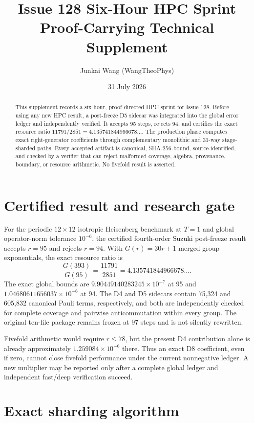 \documentclass[10pt]{article}
\title{Issue 128 Six-Hour HPC Sprint\\\large Proof-Carrying Technical Supplement}
\author{Junkai Wang (WangTheoPhys)}
\date{31 July 2026}
\begin{document}
\maketitle

\begin{abstract}
This supplement records a six-hour, proof-directed HPC sprint for Issue 128.
Before using any new HPC result, a post-freeze D5 sidecar was integrated into
the global error ledger and independently verified.  It accepts 95 steps,
rejects 94, and certifies the exact resource ratio
$11791/2851=4.135741844966678\ldots$.  The production phase computes exact
right-generator coefficients through complementary monolithic and 31-way
stage-sharded paths.  Every accepted artifact is canonical, SHA-256-bound,
source-identified, and checked by a verifier that can reject malformed
coverage, algebra, provenance, boundary, or resource arithmetic.  No
fivefold result is asserted.
\end{abstract}

\section{Certified result and research gate}

For the periodic $12\times12$ isotropic Heisenberg benchmark at $T=1$ and
global operator-norm tolerance $10^{-6}$, the certified fourth-order Suzuki
post-freeze result accepts $r=95$ and rejects $r=94$.  With
$G(r)=30r+1$ merged group exponentials, the exact resource ratio is
\[
  \frac{G(393)}{G(95)}=\frac{11791}{2851}
  =4.135741844966678\ldots .
\]
The exact global bounds are $9.90449140283245\times10^{-7}$ at 95 and
$1.04680611656037\times10^{-6}$ at 94.  The D4 and D5 sidecars contain 75,324
and 605,832 canonical Pauli terms, respectively, and both are independently
checked for complete coverage and pairwise anticommutation within every
group.  The original ten-file package remains frozen at 97 steps and is not
silently rewritten.

Fivefold arithmetic would require $r\le78$, but the present D4 contribution
alone is already approximately $1.259084\times10^{-6}$ there.  Thus an exact
D8 coefficient, even if zero, cannot close fivefold performance under the
current nonnegative ledger.  A new multiplier may be reported only after a
complete global ledger and independent fast/deep verification succeed.

\section{Exact sharding algorithm}
\end{document}
